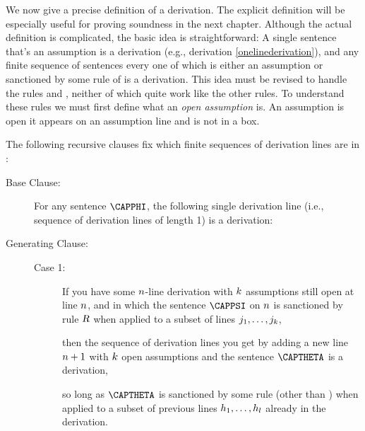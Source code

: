 We now give a precise definition of a derivation. 
The explicit definition will be especially useful for proving soundness in the next chapter.
Although the actual definition is complicated, the basic idea is straightforward: 
A single \GSL{} sentence that's an assumption is a derivation (e.g., derivation \ref{onelinederivation}), and any finite sequence of \GSL{} sentences every one of which is either an assumption or sanctioned by some rule of \GSD{} is a derivation. 
This idea must be revised to handle the rules  and , neither of which quite work like the other rules.
To understand these rules we must first define what an \emph{open assumption} is. An assumption is open \Iff it appears on an assumption line and is not in a box.
\begin{majorILnc}{} The following recursive clauses fix which finite sequences of derivation lines are  in \GSD{}:
\begin{description}
\item[Base Clause:] For any \GSL{} sentence $\CAPPHI$, the following single derivation line (i.e., sequence of derivation lines of length 1) is a derivation: 
\begin{gproofnn}
\end{gproofnn}
\item[Generating Clause:] \hfill{}
\begin{description}
\item[Case 1:] If you have some $n$-line derivation with $k$ assumptions still open at line $n$, and in which the sentence $\CAPPSI$ on $n$ is sanctioned by rule $\textsl{R}$ when applied to a subset of lines $j_1,\ldots,j_k$, 
\begin{gproofnn}
\glinend{}{}{}
\glinend{}{$\qquad\vdots$}{}
\glinend{}{}{}
\end{gproofnn}
then the sequence of derivation lines you get by adding a new line $n+1$ with $k$ open assumptions and the sentence $\CAPTHETA$ is a derivation,
\begin{gproofnn}
\glinend{}{}{}
\glinend{}{$\qquad\vdots$}{}
\glinend{}{}{}
\end{gproofnn}
so long as $\CAPTHETA$ is sanctioned by some rule  (other than ) when applied to a subset of previous lines $h_1,\ldots,h_l$ already in the derivation. 


\end{description}
\end{description}
\end{majorILnc}
